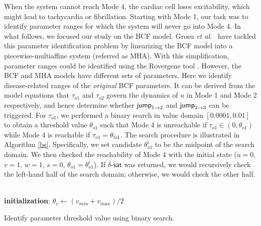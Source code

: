 When the system cannot reach Mode 4, the cardiac cell loses excitability, which might lead to tachycardia or fibrillation. Starting with Mode 1, our task was to identify parameter ranges for which the system will never go into Mode 4. In what follows, we focused our study on the BCF model.
Grosu {\em et al.}~\cite{grosu11} have tackled this parameter identification problem by linearizing the BCF model into a piecewise-multiaffine system (referred as MHA). With this simplification, parameter ranges could be identified using the Rovergene tool \cite{rovergene}. However, the BCF and MHA models have different sets of parameters. Here we identify disease-related ranges of the {\em original} BCF parameters. It can be derived from the model equations that $\tau_{o1}$ and $\tau_{o2}$ govern the dynamics of $u$ in Mode 1 and Mode 2 respectively, and hence determine whether $\mathsf{jump}_{1\rightarrow 2}$ and  $\mathsf{jump}_{2\rightarrow 3}$ can be triggered. For $\tau_{o1}$, we performed a binary search in value domain $[0.0001,0.01]$ to obtain a threshold value $\theta_{o1}$ such that Mode 4 is unreachable if $\tau_{o1} \in (0, \theta_{o1})$ while Mode 4 is reachable if $\tau_{o1} =  \theta_{to1}$. The search procedure is illustrated in Algorithm \ref{bs}. Specifically, we set candidate $\theta^i_{o1}$ to be the midpoint of the search domain. We then checked the reachability of Mode 4 with the initial state ($u = 0$, $v = 1$, $w = 1$, $s = 0$, $\theta_{o1} = \theta^i_{o1}$). If $\delta$-$\mathsf{sat}$ was returned, we would recursively check the left-hand half of the search domain; otherwise, we would check the other half.

\begin{algorithm}
\SetAlgoLined
{}
\\
\textbf{initialization}: $\theta_{v} \leftarrow (v_{min}+v_{max})/2$\;
\caption{Identify parameter threshold value using binary search. \label{bs}}
\end{algorithm}




